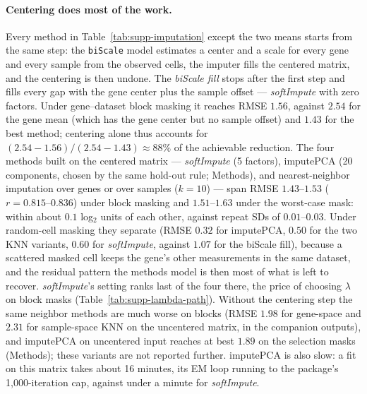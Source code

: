 \documentclass[11pt,a4paper]{article}
\begin{document}
\paragraph{Centering does most of the work.}
Every method in Table~\ref{tab:supp-imputation} except the two
means starts from the same step: the \texttt{biScale} model
\citep{Hastie2015} estimates a center and a scale for every gene
and every sample from the observed cells, the imputer fills the
centered matrix, and the centering is then undone. The
\emph{biScale fill} stops after the first step and fills every gap
with the gene center plus the sample offset --- \textit{softImpute}
with zero factors. Under gene--dataset block masking it reaches
RMSE $1.56$, against $2.54$ for the gene mean (which has the gene
center but no sample offset) and $1.43$ for the best method;
centering alone thus accounts for
$(2.54 - 1.56)/(2.54 - 1.43) \approx 88\%$ of the achievable
reduction. The four methods built on the centered matrix ---
\textit{softImpute} (5 factors), imputePCA (20 components, chosen
by the same hold-out rule; Methods), and nearest-neighbor
imputation over genes or over samples ($k = 10$) --- span RMSE
$1.43$--$1.53$ ($r = 0.815$--$0.836$) under block masking and
$1.51$--$1.63$ under the worst-case mask: within about $0.1$
log$_2$ units of each other, against repeat SDs of
$0.01$--$0.03$. Under random-cell masking they separate (RMSE
$0.32$ for imputePCA, $0.50$ for the two KNN variants, $0.60$ for
\textit{softImpute}, against $1.07$ for the biScale fill),
because a scattered masked cell keeps the gene's other
measurements in the same dataset, and the residual pattern the
methods model is then most of what is left to recover.
\textit{softImpute}'s setting ranks last of the four there, the
price of choosing $\lambda$ on block masks
(Table~\ref{tab:supp-lambda-path}). Without the centering step the
same neighbor methods are much worse on blocks (RMSE $1.98$ for
gene-space and $2.31$ for sample-space KNN on the uncentered
matrix, in the companion outputs), and imputePCA on uncentered
input reaches at best $1.89$ on the selection masks
(Methods); these variants are not reported further. imputePCA is
also slow: a fit on this matrix takes about 16 minutes, its EM
loop running to the package's 1{,}000-iteration cap, against under
a minute for \textit{softImpute}.
\end{document}
